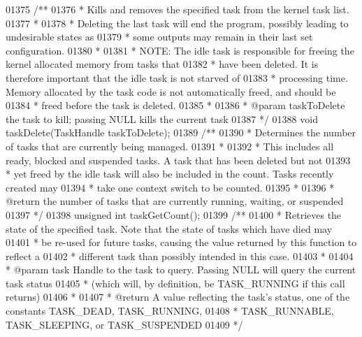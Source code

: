 \begin{DoxyCode}
{{{{{{{{{01375 \textcolor{comment}{/**}
01376 \textcolor{comment}{ * Kills and removes the specified task from the kernel task list.}
01377 \textcolor{comment}{ *}
01378 \textcolor{comment}{ * Deleting the last task will end the program, possibly leading to undesirable states as}
01379 \textcolor{comment}{ * some outputs may remain in their last set configuration.}
01380 \textcolor{comment}{ *}
01381 \textcolor{comment}{ * NOTE: The idle task is responsible for freeing the kernel allocated memory from tasks that}
01382 \textcolor{comment}{ * have been deleted. It is therefore important that the idle task is not starved of}
01383 \textcolor{comment}{ * processing time. Memory allocated by the task code is not automatically freed, and should be}
01384 \textcolor{comment}{ * freed before the task is deleted.}
01385 \textcolor{comment}{ *}
01386 \textcolor{comment}{ * @param taskToDelete the task to kill; passing NULL kills the current task}
01387 \textcolor{comment}{ */}
01388 \textcolor{keywordtype}{void} taskDelete(TaskHandle taskToDelete);
01389 \textcolor{comment}{/**}
01390 \textcolor{comment}{ * Determines the number of tasks that are currently being managed.}
01391 \textcolor{comment}{ *}
01392 \textcolor{comment}{ * This includes all ready, blocked and suspended tasks. A task that has been deleted but not}
01393 \textcolor{comment}{ * yet freed by the idle task will also be included in the count. Tasks recently created may}
01394 \textcolor{comment}{ * take one context switch to be counted.}
01395 \textcolor{comment}{ *}
01396 \textcolor{comment}{ * @return the number of tasks that are currently running, waiting, or suspended}
01397 \textcolor{comment}{ */}
01398 \textcolor{keywordtype}{unsigned} \textcolor{keywordtype}{int} taskGetCount();
01399 \textcolor{comment}{/**}
01400 \textcolor{comment}{ * Retrieves the state of the specified task. Note that the state of tasks which have died may}
01401 \textcolor{comment}{ * be re-used for future tasks, causing the value returned by this function to reflect a}
01402 \textcolor{comment}{ * different task than possibly intended in this case.}
01403 \textcolor{comment}{ *}
01404 \textcolor{comment}{ * @param task Handle to the task to query. Passing NULL will query the current task status}
01405 \textcolor{comment}{ * (which will, by definition, be TASK\_RUNNING if this call returns)}
01406 \textcolor{comment}{ *}
01407 \textcolor{comment}{ * @return A value reflecting the task's status, one of the constants TASK\_DEAD, TASK\_RUNNING,}
01408 \textcolor{comment}{ * TASK\_RUNNABLE, TASK\_SLEEPING, or TASK\_SUSPENDED}
01409 \textcolor{comment}{ */}
}}}}}}}}}
\end{DoxyCode}
